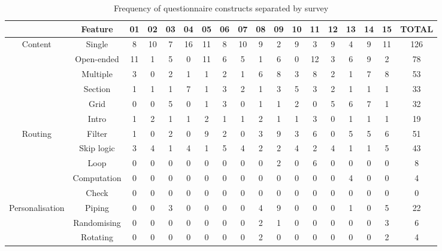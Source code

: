 \begin{sidewaystable}
\begin{center}
\begin{tabular}{|c|c|c|c|c|c|c|c|c|c|c|c|c|c|c|c|c|c|}
\hline 
 & Feature & 01 & 02 & 03 & 04 & 05 & 06 & 07 & 08 & 09 & 10 & 11 & 12 & 13 & 14 & 15 & TOTAL\tabularnewline
\hline 
\hline 
\multirow{6}{*}{Content} & Single & 8 & 10 & 7 & 16 & 11 & 8 & 10 & 9 & 2 & 9 & 3 & 9 & 4 & 9 & 11 & 126\tabularnewline
\cline{2-18} 
 & Open-ended & 11 & 1 & 5 & 0 & 11 & 6 & 5 & 1 & 6 & 0 & 12 & 3 & 6 & 9 & 2 & 78\tabularnewline
\cline{2-18} 
 & Multiple & 3 & 0 & 2 & 1 & 1 & 2 & 1 & 6 & 8 & 3 & 8 & 2 & 1 & 7 & 8 & 53\tabularnewline
\cline{2-18} 
 & Section & 1 & 1 & 1 & 7 & 1 & 3 & 2 & 1 & 3 & 5 & 3 & 2 & 1 & 1 & 1 & 33\tabularnewline
\cline{2-18} 
 & Grid & 0 & 0 & 5 & 0 & 1 & 3 & 0 & 1 & 1 & 2 & 0 & 5 & 6 & 7 & 1 & 32\tabularnewline
\cline{2-18} 
 & Intro & 1 & 2 & 1 & 1 & 2 & 1 & 1 & 2 & 1 & 1 & 3 & 0 & 1 & 1 & 1 & 19\tabularnewline
\hline 
\multirow{5}{*}{Routing} & Filter & 1 & 0 & 2 & 0 & 9 & 2 & 0 & 3 & 9 & 3 & 6 & 0 & 5 & 5 & 6 & 51\tabularnewline
\cline{2-18} 
 & Skip logic & 3 & 4 & 1 & 4 & 1 & 5 & 4 & 2 & 2 & 4 & 2 & 4 & 1 & 1 & 5 & 43\tabularnewline
\cline{2-18} 
 & Loop & 0 & 0 & 0 & 0 & 0 & 0 & 0 & 0 & 2 & 0 & 6 & 0 & 0 & 0 & 0 & 8\tabularnewline
\cline{2-18} 
 & Computation & 0 & 0 & 0 & 0 & 0 & 0 & 0 & 0 & 0 & 0 & 0 & 0 & 4 & 0 & 0 & 4\tabularnewline
\cline{2-18} 
 & Check & 0 & 0 & 0 & 0 & 0 & 0 & 0 & 0 & 0 & 0 & 0 & 0 & 0 & 0 & 0 & 0\tabularnewline
\hline 
\multirow{3}{*}{Personalisation} & Piping & 0 & 0 & 3 & 0 & 0 & 0 & 0 & 4 & 9 & 0 & 0 & 0 & 1 & 0 & 5 & 22\tabularnewline
\cline{2-18} 
 & Randomising & 0 & 0 & 0 & 0 & 0 & 0 & 0 & 2 & 1 & 0 & 0 & 0 & 0 & 0 & 3 & 6\tabularnewline
\cline{2-18} 
 & Rotating & 0 & 0 & 0 & 0 & 0 & 0 & 0 & 2 & 0 & 0 & 0 & 0 & 0 & 0 & 2 & 4\tabularnewline
\hline 
\end{tabular}
\caption{Frequency of questionnaire constructs separated by survey}
\label{tab:eval:frequencies}
\end{center}
\end{sidewaystable}
